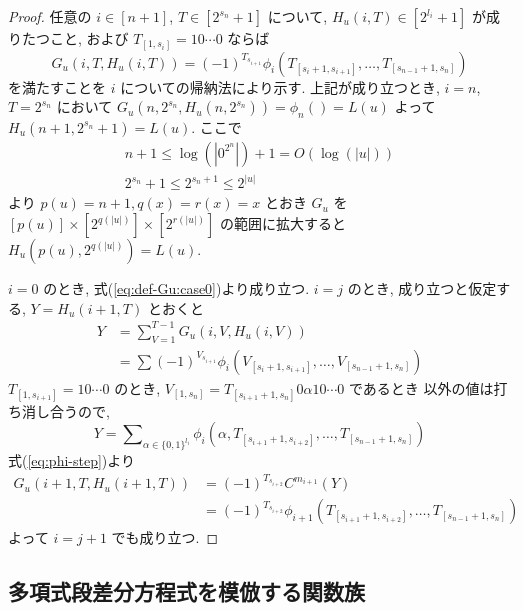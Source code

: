 \begin{proof}
 任意の $i \in [n+1]$, $T \in [2^{s_n}+1]$ について,
 $H_u(i,T) \in [2^{l_i}+1]$ が成りたつこと,
 および $T_{[1,s_i]} = 10 \cdots 0$ ならば
 \begin{equation} \label{eq:subformula}
  G_u(i,T,H_u(i,T)) = (-1)^{T_{s_{i+1}}} 
   \phi_i(T_{[s_i+1, s_{i+1}]}, \dots, T_{[s_{n-1}+1, s_n]})
 \end{equation}
 を満たすことを $i$ についての帰納法により示す.
 上記が成り立つとき,
 $i=n$, $T=2^{s_n}$ において $G_u(n, 2^{s_n}, H_u(n,2^{s_n})) = \phi_n() = L(u)$
 よって $H_u(n+1, 2^{s_n}+1) = L(u)$.
 ここで 
 \begin{gather}
  n+1 \le \log(|0^{2^n}|) + 1 = O(\log(|u|)) \\
  2^{s_n}+1 \le 2^{s_n+1} \le 2^{|u|}
 \end{gather}
 より $p(u) = n+1, q(x) = r(x) = x$ とおき $G_u$ を
 $[p(u)] \times [2^{q(|u|)}] \times [2^{r(|u|)}]$ の範囲に拡大すると
 $H_u(p(u), 2^{q(|u|)}) = L(u)$.

 $i=0$ のとき, 式(\ref{eq:def-Gu:case0})より成り立つ.
 $i=j$ のとき, 成り立つと仮定する, $Y = H_u(i+1, T)$ とおくと
 \begin{align}
  Y 
  &= \sum_{V = 1}^{T-1} G_u(i, V, H_u(i, V)) \\
  &= \sum (-1)^{V_{s_{i+1}}} \phi_i(V_{[s_i+1, s_{i+1}]}, 
   \dots, V_{[s_{n-1}+1, s_n]})
 \end{align}
 $T_{[1, s_{i+1}]} = 10 \cdots 0$ のとき,
 $V_{[1, s_n]} = T_{[s_{i+1}+1,s_n]} 0 \alpha 1 0 \cdots 0$ であるとき
 以外の値は打ち消し合うので,
 \begin{equation}
  Y = \sum\nolimits_{\alpha \in \{0,1\}^{l_i}} 
  \phi_i(\alpha, T_{[s_{i+1}+1, s_{i+2}]}, \dots, T_{[s_{n-1}+1, s_n]})
 \end{equation}
 式(\ref{eq:phi-step})より
 \begin{align}
  G_u(i+1,T,H_u(i+1,T)) 
  &= (-1)^{T_{s_{i+2}}} C^{m_{i+1}} (Y)\\
  &= (-1)^{T_{s_{i+2}}} \phi_{i+1}(T_{[s_{i+1}+1, s_{i+2}]}, \dots, T_{[s_{n-1}+1, s_n]})
 \end{align}
 よって $i=j+1$ でも成り立つ.
 \end{proof}



\subsection{多項式段差分方程式を模倣する関数族}


